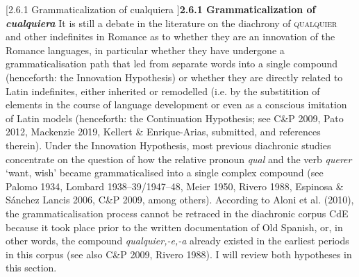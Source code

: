 \documentclass[10pt]{article}
\makeatletter
\renewcommand\subsubsection{\@startsection{subsubsection}{3}{0.0cm}{0in}{0.1mm}{\normalfont\normalsize\fontsize{12pt}{14.4pt}\selectfont}}
\newenvironment{styleStandard}{\renewcommand\baselinestretch{1.25}\setlength\leftskip{0cm}\setlength\rightskip{0cm}\setlength\parindent{0cm}\setlength\parfillskip{0pt plus 1fil}\setlength\parskip{0in plus 1pt}\writerlistparindent\writerlistleftskip\leavevmode\normalfont\normalsize\fontsize{12pt}{14.4pt}\selectfont\writerlistlabel\ignorespaces}{\unskip\vspace{0in plus 1pt}\par}
\newcommand\writerlistleftskip{}
\newcommand\writerlistparindent{}
\newcommand\writerlistlabel{}
\makeatother
\begin{document}
\subsubsection[2.6.1 Grammaticalization of cualquiera ]{\textbf{2.6.1 Grammaticalization of }\textbf{\textit{cualquiera}}\textbf{ }}
\begin{styleStandard}
It is still a debate in the literature on the diachrony of \textsc{qualquier} and other indefinites in Romance as to whether they are an innovation of the Romance languages, in particular whether they have undergone a grammaticalisation path that led from separate words into a single compound (henceforth: the Innovation Hypothesis) or whether they are directly related to Latin indefinites, either inherited or remodelled (i.e. by the substitition of elements in the course of language development or even as a conscious imitation of Latin models (henceforth: the Continuation Hypothesis; see C\&P 2009, Pato 2012, Mackenzie 2019, Kellert \& Enrique-Arias, submitted, and references therein). Under the Innovation Hypothesis, most previous diachronic studies concentrate on the question of how the relative pronoun \textit{qual} and the verb \textit{querer} ‘want, wish’ became grammaticalised into a single complex compound (see Palomo 1934, Lombard 1938–39/1947–48, Meier 1950, Rivero 1988, Espinosa \& Sánchez Lancis 2006, C\&P 2009, among others). According to Aloni et al. (2010), the grammaticalisation process cannot be retraced in the diachronic corpus CdE because it took place prior to the written documentation of Old Spanish, or, in other words, the compound \textit{qualquier,\nobreakdash-e,\nobreakdash-a} already existed in the earliest periods in this corpus (see also C\&P 2009, Rivero 1988). I will review both hypotheses in this section.
\end{styleStandard}
\end{document}
